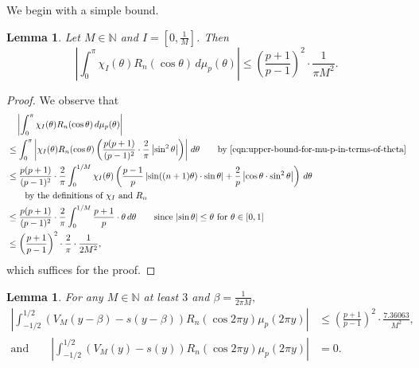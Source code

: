 \documentclass[11pt,letterpaper,reqno]{amsart}
\newtheorem{lemma}[theorem]{Lemma}
\theoremstyle{definition}
\numberwithin{equation}{section}
\numberwithin{figure}{section}
\numberwithin{table}{section}
\begin{document}
We begin with a simple bound.
\begin{lemma} \label{lem:kim-integral-simple}
    Let $M \in \mathbb{N}$ and $I = \left[ 0, \frac{1}{M} \right]$. Then
    $$\left| \int_0^\pi \chi_I(\theta) R_n(\cos \theta) \,d\mu_p(\theta) \right| \leq \left(  \frac{p + 1}{p - 1} \right)^2 \cdot \frac{1}{\pi M^2}.$$
\end{lemma}

\begin{proof}
    We observe that
    \begin{align}
        &\quad \left| \int_0^\pi \chi_I(\theta) R_n(\cos \theta) \,d\mu_p(\theta) \right|\\
        &\leq  \int_0^\pi \left|\chi_I(\theta) R_n(\cos \theta) \left(  \frac{p(p + 1)}{(p - 1)^2} \cdot \frac{2}{\pi} \left| \sin^2 \theta \right| \right)\right| \,d\theta  \qquad \text{by \eqref{eqn:upper-bound-for-mu-p-in-terms-of-theta}}\\
        &\leq \frac{p(p + 1)}{(p - 1)^2} \cdot \frac{2}{\pi} \int_0^{1/M} \chi_I(\theta) \left( \frac{p - 1}{p}\left|\sin((n + 1) \theta) \cdot \sin \theta \right| + \frac{2}{p} \left| \cos \theta \cdot \sin^2 \theta \right|  \right) \,d\theta\\ 
        & \qquad \text{by the definitions of $\chi_I$ and $R_n$}\\
        &\leq \frac{p(p + 1)}{(p - 1)^2} \cdot \frac{2}{\pi} \int_0^{1/M}  \frac{p + 1}{p} \cdot \theta \,d\theta \qquad \text{since $\left| \sin \theta \right| \leq \theta$ for $\theta \in \left[0, 1\right]$}\\
        &\leq \left(  \frac{p + 1}{p - 1} \right)^2 \cdot \frac{2}{\pi} \cdot \frac{1}{2M^2},
    \end{align}
    which suffices for the proof.
\end{proof}

\begin{lemma}\label{lem:kim-integral-2-1}
For any $M \in \mathbb{N}$ at least $3$ and $\beta = \frac{1}{2\pi M},$
\begin{align}
    \left| \int_{-1/2}^{1/2}
 \left( V_M(y - \beta ) - s(y - \beta) \right) R_n ( \cos 2 \pi y ) \mu_p(2\pi y) \right| &\leq \left( \frac{p + 1}{p - 1}  \right)^2 \cdot  \frac{7.36063}{M^2},\\
 \text{and} \qquad
 \left| \int_{-1/2}^{1/2}
 \left( V_M(y) - s(y) \right) R_n ( \cos 2 \pi y ) \mu_p(2\pi y) \right| &= 0.
\end{align}
\end{lemma}
\end{document}
